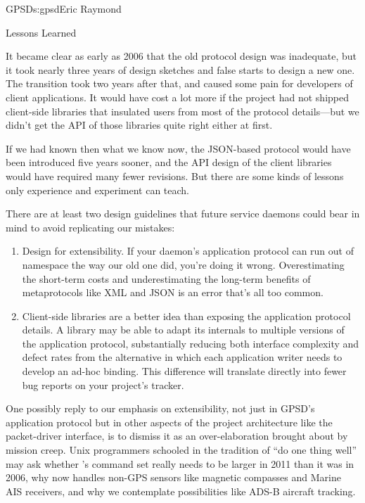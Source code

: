 \begin{aosachapter}{GPSD}{s:gpsd}{Eric Raymond}
\begin{aosasect1}{Lessons Learned}
\begin{enumerate}
\end{enumerate}

It became clear as early as 2006 that the old protocol design was
inadequate, but it took nearly three years of design sketches and 
false starts to design a new one.  The transition took two years
after that, and caused some pain for developers of client applications.
It would have cost a lot more if the project had not shipped client-side
libraries that insulated users from most of the protocol details---but
we didn't get the API of those libraries quite right either at first.

If we had known then what we know now, the JSON-based protocol would
have been introduced five years sooner, and the API design of the
client libraries would have required many fewer revisions. But there
are some kinds of lessons only experience and experiment can teach.

There are at least two design guidelines that future service daemons
could bear in mind to avoid replicating our mistakes:

\begin{enumerate}

  \item Design for extensibility.  If your daemon's application
    protocol can run out of namespace the way our old one did, you're
    doing it wrong. Overestimating the short-term costs and
    underestimating the long-term benefits of metaprotocols like XML
    and JSON is an error that's all too common.

  \item Client-side libraries are a better idea than exposing the
    application protocol details. A library may be able to adapt its
    internals to multiple versions of the application protocol,
    substantially reducing both interface complexity and defect rates
    from the alternative in which each application writer needs to
    develop an ad-hoc binding.  This difference will translate
    directly into fewer bug reports on your project's tracker.

\end{enumerate}

One possibly reply to our emphasis on extensibility, not just in
GPSD's application protocol but in other aspects of the project
architecture like the packet-driver interface, is to dismiss it as an
over-elaboration brought about by mission creep.  Unix programmers
schooled in the tradition of ``do one thing well'' may ask whether
's command set really needs to be larger in 2011 than it
was in 2006, why  now handles non-GPS sensors like magnetic
compasses and Marine AIS receivers, and why we contemplate
possibilities like ADS-B aircraft tracking.


\end{aosasect1}
\end{aosachapter}
